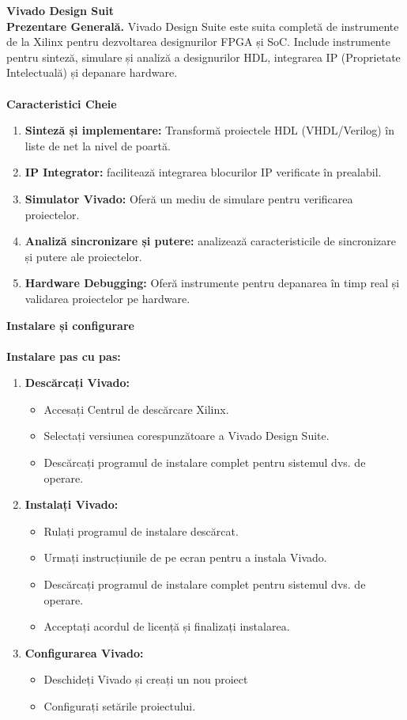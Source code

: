 \documentclass[12pt]{article}
\begin{document}
\textbf{Vivado Design Suit}\\
\hspace*{1cm}\textbf{Prezentare Generală.} Vivado Design Suite este suita completă de instrumente de la Xilinx pentru dezvoltarea designurilor FPGA și SoC. Include instrumente pentru sinteză, simulare și analiză a designurilor HDL, integrarea IP (Proprietate Intelectuală) și depanare hardware.\\\\
\hspace*{1cm}\textbf{Caracteristici Cheie}
\begin{enumerate}
    \item \textbf{Sinteză și implementare:} Transformă proiectele HDL (VHDL/Verilog) în liste de net la nivel de poartă.
    \item \textbf{IP Integrator:} facilitează integrarea blocurilor IP verificate în prealabil.
    \item \textbf{Simulator Vivado:} Oferă un mediu de simulare pentru verificarea proiectelor.
    \item \textbf{Analiză sincronizare și putere:} analizează caracteristicile de sincronizare și putere ale proiectelor.
    \item \textbf{Hardware Debugging:} Oferă instrumente pentru depanarea în timp real și validarea proiectelor pe hardware.
\end{enumerate}
\textbf{Instalare și configurare}\\\\
\textbf{Instalare pas cu pas:}\\
\begin{enumerate}
    \item \textbf{Descărcați Vivado:}
    \begin{itemize}
        \item Accesați Centrul de descărcare Xilinx.
        \item Selectați versiunea corespunzătoare a Vivado Design Suite.
        \item Descărcați programul de instalare complet pentru sistemul dvs. de operare.
    \end{itemize}
        \item \textbf{Instalați Vivado:}
    \begin{itemize}
        \item Rulați programul de instalare descărcat.
        \item Urmați instrucțiunile de pe ecran pentru a instala Vivado.
        \item Descărcați programul de instalare complet pentru sistemul dvs. de operare.
        \item Acceptați acordul de licență și finalizați instalarea.
    \end{itemize}
        \item \textbf{Configurarea Vivado:}
    \begin{itemize}
        \item Deschideți Vivado și creați un nou proiect
        \item Configurați setările proiectului.
    \end{itemize}
\end{enumerate}
\end{document}
